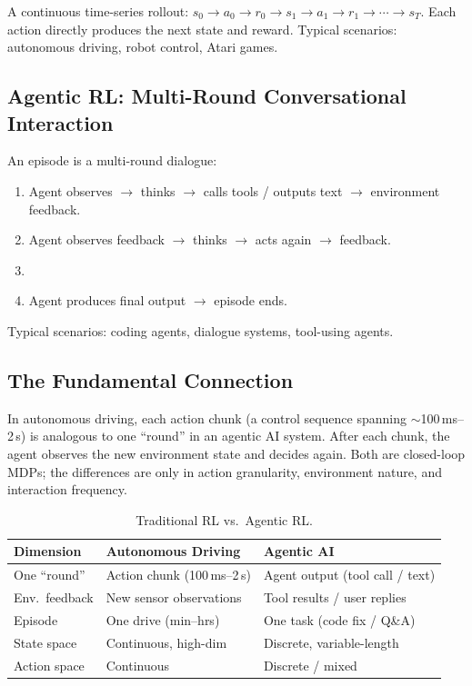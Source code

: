 A continuous time-series rollout:
$s_0 \to a_0 \to r_0 \to s_1 \to a_1 \to r_1 \to \cdots \to s_T$.
Each action directly produces the next state and reward.
Typical scenarios: autonomous driving, robot control, Atari games.

\subsection{Agentic RL: Multi-Round Conversational Interaction}

An episode is a multi-round dialogue:
\begin{enumerate}
  \item Agent observes $\to$ thinks $\to$ calls tools / outputs text $\to$ environment feedback.
  \item Agent observes feedback $\to$ thinks $\to$ acts again $\to$ feedback.
  \item[$\vdots$]
  \item Agent produces final output $\to$ episode ends.
\end{enumerate}
Typical scenarios: coding agents, dialogue systems, tool-using agents.

\subsection{The Fundamental Connection}

\begin{keyidea}
In autonomous driving, each action chunk (a control sequence spanning $\sim$100\,ms--2\,s) is analogous to one ``round'' in an agentic AI system.
After each chunk, the agent observes the new environment state and decides again.
Both are closed-loop MDPs; the differences are only in action granularity, environment nature, and interaction frequency.
\end{keyidea}

\begin{table}[htbp]
\centering
\caption{Traditional RL vs.\ Agentic RL.}
\begin{tabular}{@{}lll@{}}
\toprule
\textbf{Dimension} & \textbf{Autonomous Driving} & \textbf{Agentic AI} \\
\midrule
One ``round'' & Action chunk (100\,ms--2\,s) & Agent output (tool call / text) \\
Env.\ feedback & New sensor observations & Tool results / user replies \\
Episode & One drive (min--hrs) & One task (code fix / Q\&A) \\
State space & Continuous, high-dim & Discrete, variable-length \\
Action space & Continuous & Discrete / mixed \\
\bottomrule
\end{tabular}
\end{table}

